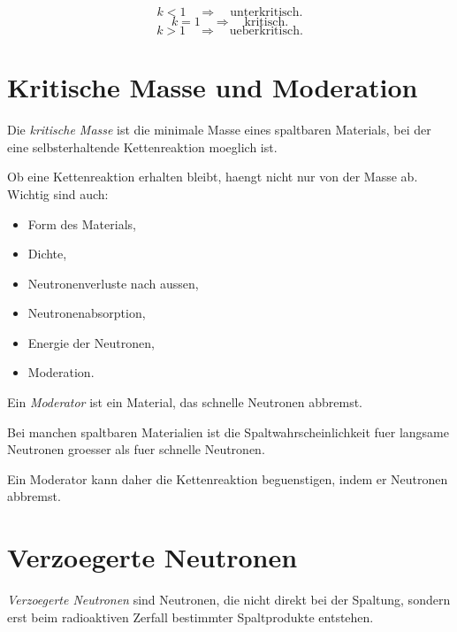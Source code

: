 \begin{formulabox}
\[
    k<1
    \quad\Rightarrow\quad
    \text{unterkritisch}.
\]
\[
    k=1
    \quad\Rightarrow\quad
    \text{kritisch}.
\]
\[
    k>1
    \quad\Rightarrow\quad
    \text{ueberkritisch}.
\]
\end{formulabox}

\section{Kritische Masse und Moderation}

\begin{definitionbox}
Die \emph{kritische Masse} ist die minimale Masse eines spaltbaren Materials,
bei der eine selbsterhaltende Kettenreaktion moeglich ist.
\end{definitionbox}

\begin{conceptbox}
Ob eine Kettenreaktion erhalten bleibt, haengt nicht nur von der Masse ab.
Wichtig sind auch:
\begin{itemize}
    \item Form des Materials,
    \item Dichte,
    \item Neutronenverluste nach aussen,
    \item Neutronenabsorption,
    \item Energie der Neutronen,
    \item Moderation.
\end{itemize}
\end{conceptbox}

\begin{definitionbox}
Ein \emph{Moderator} ist ein Material, das schnelle Neutronen abbremst.
\end{definitionbox}

\begin{conceptbox}
Bei manchen spaltbaren Materialien ist die Spaltwahrscheinlichkeit fuer langsame
Neutronen groesser als fuer schnelle Neutronen.

Ein Moderator kann daher die Kettenreaktion beguenstigen, indem er Neutronen abbremst.
\end{conceptbox}

\section{Verzoegerte Neutronen}

\begin{definitionbox}
\emph{Verzoegerte Neutronen} sind Neutronen, die nicht direkt bei der Spaltung,
sondern erst beim radioaktiven Zerfall bestimmter Spaltprodukte entstehen.
\end{definitionbox}

